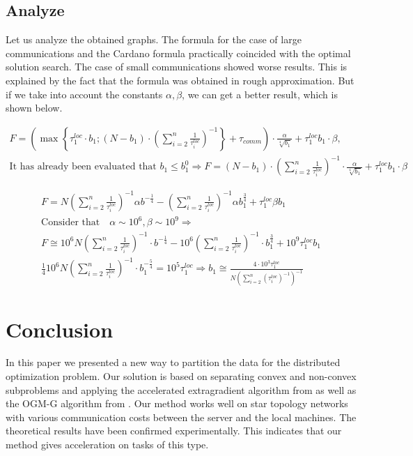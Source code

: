 \documentclass{article}
\begin{document}
\subsection{Analyze}
Let us analyze the obtained graphs. The formula for the case of large communications and the Cardano formula practically coincided with the optimal solution search. The case of small communications showed worse results. This is explained by the fact that the formula was obtained in rough approximation. But if we take into account the constants $\alpha, \beta$, we can get a better result, which is shown below.



\begin{gather*}
    F=\left(\max \left\{\tau_1^{loc} \cdot b_1 ;\left(N-b_1\right) \cdot\left(\sum_{i=2}^n \frac{1}{\tau_i^{loc}}\right)^{-1}\right\}+\tau_{comm}\right) \cdot \frac{\alpha}{\sqrt[4]{b_1}}+\tau_1^{loc} b_1 \cdot \beta, \\
    \text {It has already been evaluated that } b_1 \leq b_1^0 \Rightarrow F=\left(N-b_1\right)\cdot \left(\sum_{i=2}^n \frac{1}{\tau_i^{loc}}\right)^{-1} \cdot \frac{\alpha}{\sqrt[4]{b_1}}+\tau_1^{loc} b_1 \cdot \beta
\end{gather*}


\begin{gather*}
    F=N\left(\sum_{i=2}^n \frac{1}{\tau_i^{loc}}\right)^{-1} \alpha b^{-\frac{1}{4}}-\left(\sum_{i=2}^n \frac{1}{\tau_i^{loc}}\right)^{-1} \alpha b_1^{\frac{3}{4}}+\tau_1^{l o c} \beta b_1 \\
    \text {Consider that} \quad \alpha \sim 10^6, \beta \sim 10^9 \Rightarrow \\ 
    F \cong 10^6 N \left(\sum_{i=2}^n \frac{1}{\tau_i^{loc}}\right)^{-1} \cdot b^{-\frac{1}{4}}-10^6 \left(\sum_{i=2}^n \frac{1}{\tau_i^{loc}}\right)^{-1} \cdot b_1^{\frac{3}{4}}+10^9 \tau_1^{loc} b_1 \\
    \frac{1}{4} 10^6 N \left(\sum_{i=2}^n \frac{1}{\tau_i^{loc}}\right)^{-1} \cdot b_1^{-\frac{5}{4}}=10^5 \tau_1^{loc} \Rightarrow b_1 \cong \frac{4 \cdot 10^3 \tau_1^{loc}}{N\left(\sum_{i=2}^n\left(\tau_i^{loc}\right)^{-1}\right)^{-1}}
\end{gather*}

\section{Conclusion}

In this paper we presented a new way to partition the data for the distributed optimization problem. Our solution is based on separating convex and non-convex subproblems and applying the accelerated extragradient algorithm from \citep{kovalev2022optimal} as well as the OGM-G algorithm from \citep{kim2021optimizing}. Our method works well on star topology networks with various communication costs between the server and the local machines. The theoretical results have been confirmed experimentally. This indicates that our method gives acceleration on tasks of this type.


  
\end{document}
